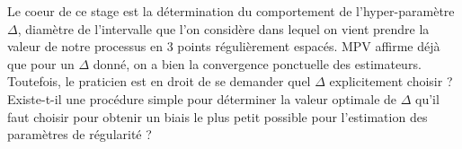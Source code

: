 \bigskip

Le coeur de ce stage est la détermination du comportement de l'hyper-paramètre $\Delta$, diamètre de l'intervalle que l'on considère dans lequel on vient prendre la valeur de notre processus en 3 points régulièrement espacés. MPV affirme déjà que pour un $\Delta$ donné, on a bien la convergence ponctuelle des estimateurs. \cite{maissoro-SmoothnessFTSweakDep}
Toutefois, le praticien est en droit de se demander quel $\Delta$ explicitement choisir ? Existe-t-il une procédure simple pour déterminer la valeur optimale de $\Delta$ qu'il faut choisir pour obtenir un biais le plus petit possible pour l'estimation des paramètres de régularité ?



